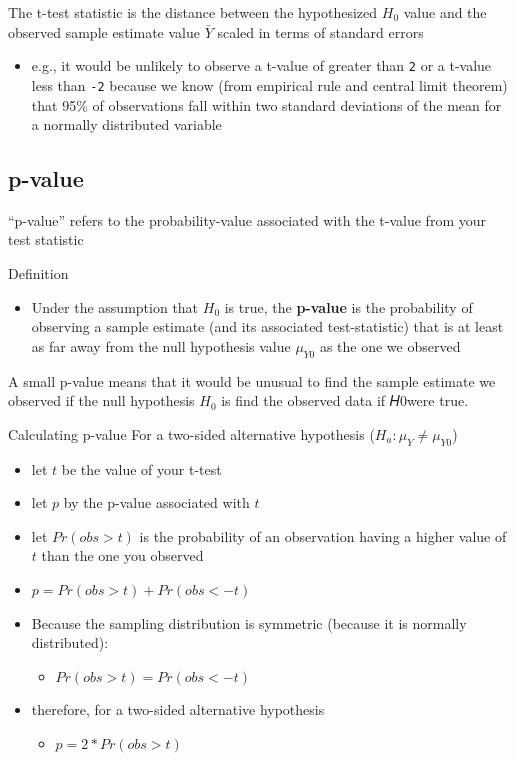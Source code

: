 \documentclass[
  letterpaper,
  DIV=11,
  numbers=noendperiod]{scrartcl}
\providecommand{\tightlist}{%
  \setlength{\itemsep}{0pt}\setlength{\parskip}{0pt}}\usepackage{longtable,booktabs,array}
\begin{document}
The t-test statistic is the distance between the hypothesized \(H_0\)
value and the observed sample estimate value \(\bar{Y}\) scaled in terms
of standard errors

\begin{itemize}
\tightlist
\item
  e.g., it would be unlikely to observe a t-value of greater than
  \texttt{2} or a t-value less than \texttt{-2} because we know (from
  empirical rule and central limit theorem) that 95\% of observations
  fall within two standard deviations of the mean for a normally
  distributed variable
\end{itemize}

\subsection{p-value}\label{p-value}

``p-value'' refers to the probability-value associated with the t-value
from your test statistic

Definition

\begin{itemize}
\tightlist
\item
  Under the assumption that \(H_0\) is true, the \textbf{p-value} is the
  probability of observing a sample estimate (and its associated
  test-statistic) that is at least as far away from the null hypothesis
  value \(\mu_{Y0}\) as the one we observed
\end{itemize}

A small p-value means that it would be unusual to find the sample
estimate we observed if the null hypothesis \(H_0\) is find the observed
data if 𝐻0were true.

Calculating p-value For a two-sided alternative hypothesis
(\(H_a: \mu_Y \neq \mu_{Y0}\))

\begin{itemize}
\tightlist
\item
  let \(t\) be the value of your t-test
\item
  let \(p\) by the p-value associated with \(t\)
\item
  let \(Pr(obs>t)\) is the probability of an observation having a higher
  value of \(t\) than the one you observed
\item
  \(p = Pr(obs > t) + Pr(obs< -t)\)
\item
  Because the sampling distribution is symmetric (because it is normally
  distributed):

  \begin{itemize}
  \tightlist
  \item
    \(Pr(obs >t) = Pr(obs < - t)\)
  \end{itemize}
\item
  therefore, for a two-sided alternative hypothesis

  \begin{itemize}
  \tightlist
  \item
    \(p = 2*Pr(obs > t)\)
  \end{itemize}
\end{itemize}
\end{document}
